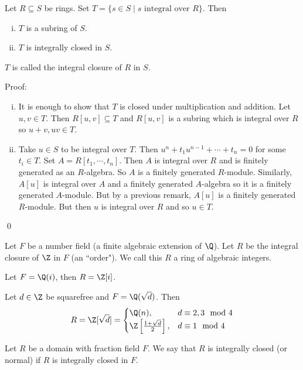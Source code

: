 \begin{prop}
Let $R \subseteq S$ be rings. Set $T=\{s \in S\;|\; s \text{ integral over }R\}$. Then 
\begin{enumerate}[(i)]
\item $T$ is a subring of $S$.
\item $T$ is integrally closed in $S$.
\end{enumerate}
$T$ is called the integral closure of $R$ in $S$.
\end{prop}

\noindent Proof: 
\begin{enumerate}[(i)]
\item It is enough to show that $T$ is closed under multiplication and addition. Let $u,v \in T$. Then $R[u,v] \subseteq T$ and $R[u,v]$ is a subring which is integral over $R$ so $u+v,uv \in T$. 

\item Take $u \in S$ to be integral over $T$. Then $u^n+t_1u^{n-1}+\cdots+t_n=0$ for some $t_i \in T$. Set $A=R[t_1,\cdots,t_n]$. Then $A$ is integral over $R$ and is finitely generated as an $R$-algebra. So $A$ is a finitely generated $R$-module. Similarly, $A[u]$ is integral over $A$ and a finitely generated $A$-algebra so it is a finitely generated $A$-module. But by a previous remark, $A[u]$ is a finitely generated $R$-module. But then $u$ is integral over $R$ and so $u \in T$.
\end{enumerate}
\qed \\

\begin{ex}
Let $F$ be a number field (a finite algebraic extension of $\Q$). Let $R$ be the integral closure of $\Z$ in $F$ (an ``order"). We call this $R$ a ring of algebraic integers. 
\end{ex}

\begin{ex}
Let $F=\Q(i)$, then $R=\Z[i]$.
\end{ex}

\begin{ex}
Let $d \in \Z$ be squarefree and $F=\Q(\sqrt{d})$. Then 
\[
R=\Z[\sqrt{d}]= 
\begin{cases}
\Q(n), & d \equiv 2,3 \mod 4 \\
\Z\left[\frac{1+\sqrt{d}}{2}\right], & d \equiv 1 \mod 4
\end{cases}
\]
\end{ex}

\begin{dfn}
Let $R$ be a domain with fraction field $F$. We say that $R$ is integrally closed (or normal) if $R$ is integrally closed in $F$. 
\end{dfn}

